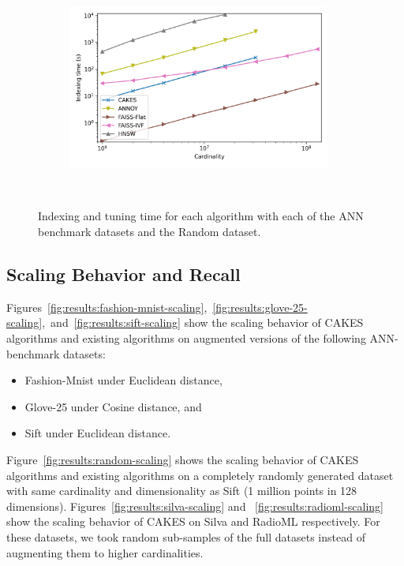 \begin{figure}
\begin{subfigure}[b]{0.47\textwidth}
        \label{fig:results:sift-indexing}
    \end{subfigure}%
    \begin{subfigure}[b]{0.47\textwidth}
        \includegraphics[width=0.95\textwidth]{plots/random-indexing.png}\\
        \label{fig:results:random-indexing}
    \end{subfigure}%
    \\
    \vspace{1em}
    \caption{Indexing and tuning time for each algorithm with each of the ANN benchmark datasets and the Random dataset.}
    \label{fig:results:indexing}
\end{figure}


\subsection{Scaling Behavior and Recall}
\label{sec:results:scaling-behavior-and-recall}

Figures~\ref{fig:results:fashion-mnist-scaling},~\ref{fig:results:glove-25-scaling},~and~\ref{fig:results:sift-scaling} show the scaling behavior of CAKES algorithms and existing algorithms on augmented versions of the following ANN-benchmark datasets:

\begin{itemize}
    \item Fashion-Mnist under Euclidean distance,
    \item Glove-25 under Cosine distance, and
    \item Sift under Euclidean distance.
\end{itemize}

Figure~\ref{fig:results:random-scaling} shows the scaling behavior of CAKES algorithms and existing algorithms on a completely randomly generated dataset with same cardinality and dimensionality as Sift (1 million points in 128 dimensions).
Figures~\ref{fig:results:silva-scaling} and ~\ref{fig:results:radioml-scaling} show the scaling behavior of CAKES on Silva and RadioML respectively.
For these datasets, we took random sub-samples of the full datasets instead of augmenting them to higher cardinalities.

